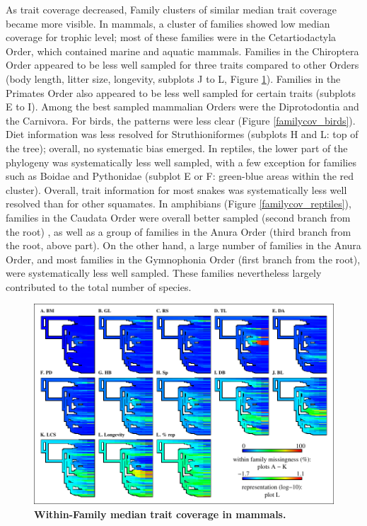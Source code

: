 As trait coverage decreased, Family clusters of similar median trait coverage became more visible. In mammals, a cluster of families showed low median coverage for trophic level; most of these families were in the Cetartiodactyla Order, which contained marine and aquatic mammals. Families in the Chiroptera Order appeared to be less well sampled for three traits compared to other Orders (body length, litter size, longevity, subplots J to L, Figure \ref{familycov_mammals}). Families in the Primates Order also appeared to be less well sampled for certain traits (subplots E to I). Among the best sampled mammalian Orders were the Diprotodontia and the Carnivora. For birds, the patterns were less clear (Figure \ref{familycov_birds}). Diet information was less resolved for Struthioniformes (subplots H and L: top of the tree); overall, no systematic bias emerged.
 In reptiles, the lower part of the phylogeny was systematically less well sampled, with a few exception for families such as Boidae and Pythonidae (subplot E or F: green-blue areas within the red cluster). Overall, trait information for most snakes was systematically less well resolved than for other squamates.
In amphibians (Figure \ref{familycov_reptiles}), families in the Caudata Order were overall better sampled  (second branch from the root) , as well as a group of families in the Anura Order (third branch from the root, above part). On the other hand, a large number of families in the Anura Order, and most families in the Gymnophonia Order (first branch from the root), were systematically less well sampled. These families nevertheless largely contributed to the total number of species. 

\pagebreak

\begin{figure}[h!]
\centering
\includegraphics[scale=1]{figures/chapter2/NA_phylo_patterns/Mammals_coverage}
\caption[Within-Family median trait coverage in mammals]{\textbf{Within-Family median trait coverage in mammals.}}
\label{familycov_mammals}
\end{figure}

